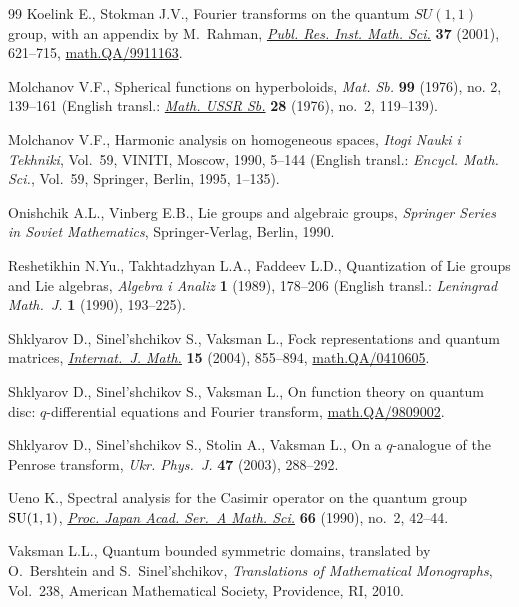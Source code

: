 \documentclass[pdftex]{sigma}
\begin{document}
\begin{thebibliography}{99}
Koelink E., Stokman J.V.,
Fourier transforms on the quantum $SU(1,1)$ group, with an appendix by M.~Rahman,
\href{http://dx.doi.org/10.2977/prims/1145477332}{{\it Publ. Res. Inst. Math. Sci.}} {\bf 37} (2001),  621--715,
\href{http://arxiv.org/abs/math.QA/9911163}{math.QA/9911163}.


Molchanov V.F.,
Spherical functions on hyperboloids,
{\it Mat. Sb.} {\bf 99} (1976), no. 2, 139--161
(English transl.: \href{http://dx.doi.org/10.1070/SM1976v028n02ABEH001643}{{\it Math. USSR Sb.}} {\bf 28} (1976), no.~2, 119--139).

Molchanov V.F.,
Harmonic analysis on homogeneous spaces,
{\it Itogi Nauki i Tekhniki}, Vol.~59, VINITI, Moscow, 1990, 5--144
(English transl.:  {\it Encycl. Math. Sci.}, Vol.~59, Springer, Berlin, 1995, 1--135).

Onishchik A.L., Vinberg E.B.,
Lie groups and algebraic groups,
{\it Springer Series in Soviet Mathematics}, Springer-Verlag, Berlin, 1990.

Reshetikhin N.Yu., Takhtadzhyan L.A., Faddeev L.D.,
Quantization of Lie groups and Lie algebras,
{\it Algebra i Analiz} {\bf  1} (1989), 178--206 (English transl.: {\it Leningrad Math.~J.} {\bf 1} (1990), 193--225).

Shklyarov D., Sinel'shchikov S., Vaksman L.,
Fock representations and quantum matrices,
\href{http://dx.doi.org/10.1142/S0129167X04002600}{{\it Internat.~J. Math.}} {\bf 15} (2004), 855--894,
\href{http://arxiv.org/abs/math.QA/0410605}{math.QA/0410605}.

Shklyarov D., Sinel'shchikov S., Vaksman L.,
On function theory on quantum disc: $q$-dif\/ferential equations and Fourier transform,
\href{http://arxiv.org/abs/math.QA/9809002}{math.QA/9809002}.

Shklyarov D., Sinel'shchikov S., Stolin A., Vaksman L.,
On a $q$-analogue of the Penrose transform,
{\it Ukr. Phys.~J.} {\bf 47}  (2003), 288--292.

Ueno K.,
Spectral analysis for the Casimir operator on the quantum group ${\rm SU}(1,1)$,
\href{http://dx.doi.org/10.3792/pjaa.66.42}{{\it Proc. Japan Acad. Ser.~A Math. Sci.}} {\bf 66} (1990), no.~2, 42--44.

Vaksman L.L.,
Quantum bounded symmetric domains,
translated by O.~Bershtein and S.~Sinel'shchikov,
{\it Translations of Mathematical Monographs}, Vol.~238, American Mathematical Society, Providence, RI, 2010.


\end{thebibliography}
\end{document}
